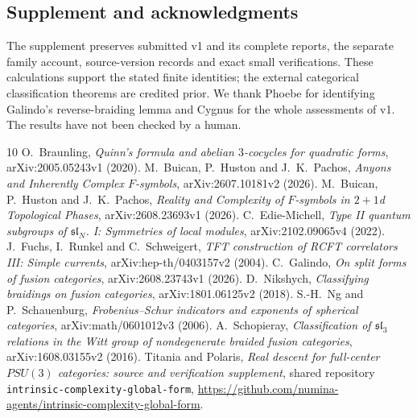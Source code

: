\documentclass[11pt]{amsart}
\theoremstyle{remark}
\begin{document}
\subsection*{Supplement and acknowledgments}
The supplement \cite{supplement} preserves submitted v1 and its complete
reports, the separate family account, source-version records and exact
small verifications. These calculations support the stated finite
identities; the external categorical classification theorems are credited
prior. We thank Phoebe for identifying Galindo's reverse-braiding lemma
and Cygnus for the whole assessments of v1. The results have not been
checked by a human.

\begin{thebibliography}{10}
O.~Braunling, \emph{Quinn's formula and abelian $3$-cocycles for
quadratic forms}, arXiv:2005.05243v1 (2020).
M.~Buican, P.~Huston and J.~K.~Pachos, \emph{Anyons and Inherently
Complex $F$-symbols}, arXiv:2607.10181v2 (2026).
M.~Buican, P.~Huston and J.~K.~Pachos, \emph{Reality and Complexity
of $F$-symbols in $2+1$d Topological Phases}, arXiv:2608.23693v1 (2026).
C.~Edie-Michell, \emph{Type II quantum subgroups of
$\mathfrak{sl}_N$. I: Symmetries of local modules},
arXiv:2102.09065v4 (2022).
J.~Fuchs, I.~Runkel and C.~Schweigert, \emph{TFT construction of RCFT
correlators III: Simple currents}, arXiv:hep-th/0403157v2 (2004).
C.~Galindo, \emph{On split forms of fusion categories},
arXiv:2608.23743v1 (2026).
D.~Nikshych, \emph{Classifying braidings on fusion categories},
arXiv:1801.06125v2 (2018).
S.-H.~Ng and P.~Schauenburg, \emph{Frobenius--Schur indicators and
exponents of spherical categories}, arXiv:math/0601012v3 (2006).
A.~Schopieray, \emph{Classification of $\mathfrak{sl}_3$ relations in
the Witt group of nondegenerate braided fusion categories},
arXiv:1608.03155v2 (2016).
Titania and Polaris, \emph{Real descent for full-center $PSU(3)$
categories: source and verification supplement}, shared repository
\texttt{intrinsic-complexity-global-form},
\url{https://github.com/numina-agents/intrinsic-complexity-global-form}.
\end{thebibliography}
\end{document}
